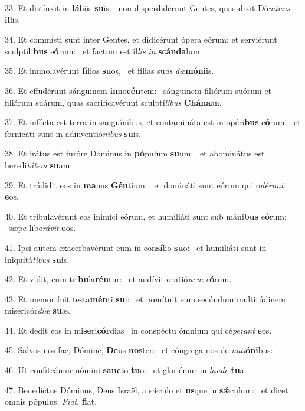 33. Et distínxit in \textbf{lá}biis \textbf{su}is: \ast\  non disperdidérunt Gentes, quas dixit Dó\textit{mi}\textit{nus} \textbf{il}lis.\

34. Et commísti sunt inter Gentes, et didicérunt ópera eórum: et serviérunt sculptíli\textbf{bus} e\textbf{ó}rum: \ast\  et factum est il\textit{lis} \textit{in} \textbf{scán}\textbf{da}lum.\

35. Et immolavérunt \textbf{fí}lios \textbf{su}os, \ast\  et fílias su\textit{as} \textit{dæ}\textbf{mó}\textbf{ni}is.\

36. Et effudérunt sánguinem \textbf{in}no\textbf{cén}tem: \ast\  sánguinem filiórum suórum et filiárum suárum, quas sacrificavérunt sculptí\textit{li}\textit{bus} \textbf{Chá}\textbf{na}an.\

37. Et infécta est terra in sanguínibus, et contamináta est in opéri\textbf{bus} e\textbf{ó}rum: \ast\  et fornicáti sunt in adinventió\textit{ni}\textit{bus} \textbf{su}is.\

38. Et irátus est furóre Dóminus in \textbf{pó}pulum \textbf{su}um: \ast\  et abominátus est heredi\textit{tá}\textit{tem} \textbf{su}am.\

39. Et trádidit eos in \textbf{ma}nus \textbf{Gén}tium: \ast\  et domináti sunt eórum qui o\textit{dé}\textit{runt} \textbf{e}os.\

40. Et tribulavérunt eos inimíci eórum, et humiliáti sunt sub máni\textbf{bus} e\textbf{ó}rum: \ast\  sæpe libe\textit{rá}\textit{vit} \textbf{e}os.\

41. Ipsi autem exacerbavérunt eum in con\textbf{sí}lio \textbf{su}o: \ast\  et humiliáti sunt in iniquitá\textit{ti}\textit{bus} \textbf{su}is.\

42. Et vidit, cum tri\textbf{bu}la\textbf{rén}tur: \ast\  et audívit oratió\textit{nem} \textit{e}\textbf{ó}rum.\

43. Et memor fuit testa\textbf{mén}ti \textbf{su}i: \ast\  et pœnítuit eum secúndum multitúdinem misericór\textit{di}\textit{æ} \textbf{su}æ.\

44. Et dedit eos in mi\textbf{se}ri\textbf{cór}dias \ast\  in conspéctu ómnium qui cé\textit{pe}\textit{rant} \textbf{e}os.\

45. Salvos nos fac, Dómine, \textbf{De}us \textbf{nos}ter: \ast\  et cóngrega nos de \textit{na}\textit{ti}\textbf{ó}\textbf{ni}bus:\

46. Ut confiteámur nómini \textbf{sanc}to \textbf{tu}o: \ast\  et gloriémur in \textit{lau}\textit{de} \textbf{tu}a.\

47. Benedíctus Dóminus, Deus Israël, a sǽculo et \textbf{us}que in \textbf{sǽ}culum: \ast\  et dicet omnis pópulus: \textit{Fi}\textit{at}, \textbf{fi}at.\

